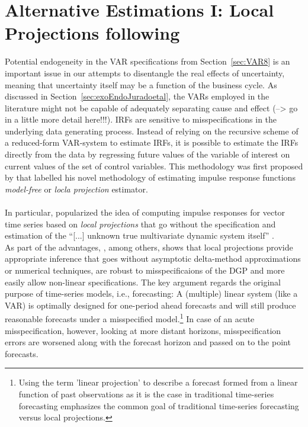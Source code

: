 \documentclass[a4paper,11pt,listof=nochaptergap,oneside,pointednumbers,bibtotoc,bigheadings,liststotoc]{scrbook}
\begin{document}
\section{Alternative Estimations I: Local Projections following \citet{jorda:05}}
Potential endogeneity in the VAR specifications from Section~\ref{sec:VAR8} is an important issue in our attempts to disentangle the real effects of uncertainty, meaning that uncertainty itself may be a function of the business cycle. As discussed in Section~\ref{sec:exoEndoJuradoetal}, the VARs employed in the literature might not be capable of adequately separating cause and effect (--> go in a little more detail here!!!). IRFs are sensitive to misspecifications in the underlying data generating process. Instead of relying on the recursive scheme of a reduced-form VAR-system to estimate IRFs, it is possible to estimate the IRFs directly from the data by regressing future values of the variable of interest on current values of the set of control variables. This methodology was first proposed by \citet{jorda:05} that labelled his novel methodology of estimating impulse response functions \textit{model-free} or \textit{locla projection} estimator.\\
\\
In particular, \citet{jorda:05} popularized the idea of computing impulse responses for vector time series based on \textit{local projections} that go without the specification and estimation of the ``[...] unknown true multivariate dynamic system itself'' \citep[p. 1]{jorda:05}. \\
As part of the advantages, \citet{jorda:05}, among others, shows that local projections provide appropriate inference that goes without asymptotic delta-method approximations or numerical techniques, are robust to misspecificaions of the DGP and more easily allow non-linear specifications. The key argument regards the original purpose of time-series models, i.e., forecasting: A (multiple) linear system (like a VAR) is optimally designed for one-period ahead forecasts and will still produce reasonable forecasts under a misspecified model.\footnote{Using the term 'linear projection' to describe a forecast formed from a linear function of past observations as it is the case in traditional time-series forecasting emphasizes the common goal of traditional time-series forecasting versus local projections.} In case of an acute misspecification, however, looking at more distant horizons, misspecification errors are worsened along with the forecast horizon and passed on to the point forecasts. 
\end{document}
